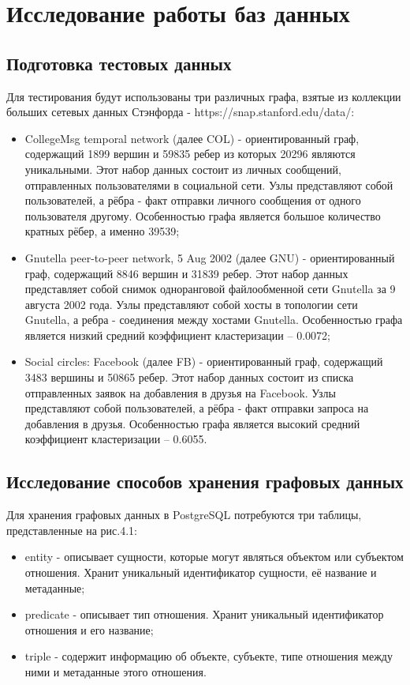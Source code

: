 \chapter{Исследование работы баз данных}


\section{Подготовка тестовых данных}

Для тестирования будут использованы три различных графа, взятые из коллекции больших сетевых данных Стэнфорда - https://snap.stanford.edu/data/:

\begin{itemize}
    \item CollegeMsg temporal network (далее COL) - ориентированный граф, содержащий 1899 вершин и 59835 ребер из которых 20296 являются уникальными. Этот набор данных состоит из личных сообщений, отправленных пользователями в социальной сети. Узлы представляют собой пользователей, а рёбра - факт отправки личного сообщения от одного пользователя другому. Особенностью графа является большое количество кратных рёбер, а именно 39539;
    \item Gnutella peer-to-peer network, 5 Aug 2002 (далее GNU) - ориентированный граф, содержащий 8846 вершин и 31839 ребер. Этот набор данных представляет собой снимок одноранговой файлообменной сети Gnutella за 9 августа 2002 года. Узлы представляют собой хосты в топологии сети Gnutella, а ребра - соединения между хостами Gnutella. Особенностью графа является низкий средний коэффициент кластеризации – 0.0072;
    \item Social circles: Facebook (далее FB) - ориентированный граф, содержащий 3483 вершины и 50865 ребер. Этот набор данных состоит из списка отправленных заявок на добавления в друзья на Facebook. Узлы представляют собой пользователей, а рёбра - факт отправки запроса на добавления в друзья. Особенностью графа является высокий средний коэффициент кластеризации – 0.6055.
\end{itemize}


\section{Исследование способов хранения графовых данных}

Для хранения графовых данных в PostgreSQL потребуются три таблицы, представленные на рис.4.1:

\begin{itemize}
    \item entity - описывает сущности, которые могут являться объектом или субъектом отношения. Хранит уникальный идентификатор сущности, её название и метаданные;
    \item predicate - описывает тип отношения. Хранит уникальный идентификатор отношения и его название;
    \item triple - содержит информацию об объекте, субъекте, типе отношения между ними и метаданные этого отношения.
\end{itemize}

